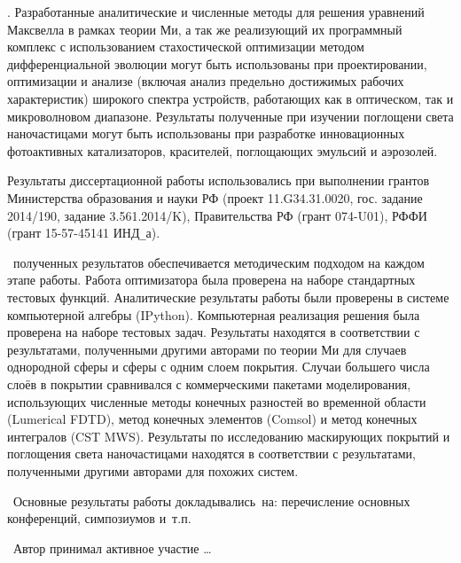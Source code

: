 \influence. Разработанные аналитические и численные методы для решения
уравнений Максвелла в рамках теории Ми, а так же реализующий их
программный комплекс с использованием стахостической оптимизации
методом дифференциальной эволюции могут быть использованы при
проектировании, оптимизации и анализе (включая анализ предельно
достижимых рабочих характеристик) широкого спектра устройств,
работающих как в оптическом, так и микроволновом диапазоне. Результаты
полученные при изучении поглощени света наночастицами могут быть
использованы при разработке инновационных фотоактивных катализаторов,
красителей, поглощающих эмульсий и аэрозолей.

Результаты диссертационной работы использовались при выполнении
грантов Министерства образования и науки РФ
(проект 11.G34.31.0020, гос. задание 2014/190, задание 3.561.2014/K),
Правительства РФ (грант 074-U01), РФФИ (грант 15-57-45141 ИНД\verb+_+а).


\reliability\ полученных результатов обеспечивается методическим
подходом на каждом этапе работы. Работа оптимизатора была проверена на
наборе стандартных тестовых функций. Аналитические результаты работы
были проверены в системе компьютерной алгебры (IPython). Компьютерная
реализация решения была проверена на наборе тестовых задач. Результаты
находятся в соответствии с результатами, полученными другими авторами
по теории Ми для случаев однородной сферы и сферы с одним слоем
покрытия.  Случаи большего числа слоёв в покрытии сравнивался с
коммерческими пакетами моделирования, использующих численные методы
конечных разностей во временной области (Lumerical FDTD), метод
конечных элементов (Comsol) и метод конечных интегралов (CST
MWS). Результаты по исследованию маскирующих покрытий и поглощения
света наночастицами находятся в соответствии с результатами,
полученными другими авторами для похожих систем. 

\probation\
Основные результаты работы докладывались~на:
перечисление основных конференций, симпозиумов и~т.\:п.

\contribution\ Автор принимал активное участие \ldots


